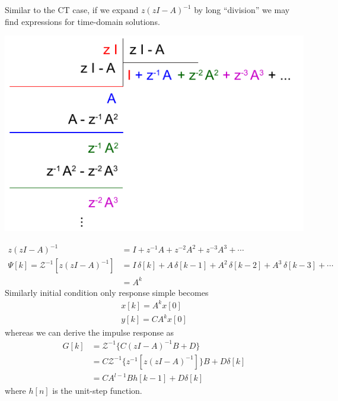 \documentclass[twoside]{article}
\begin{document}
Similar to the CT case, if we expand $z \left( z I - A \right)^{-1}$ by long ``division'' we
may find expressions for time-domain solutions. 
%
     \begin{center}
 \begin{minipage}[h]{0.5\linewidth}
     \begin{center}
       \includegraphics[width=\textwidth]{directdivision}
     \end{center}
 \end{minipage}
     \end{center}
%
\begin{align*}
z \left( z I - A \right)^{-1} &= I + z^{-1} A + z^{-2} A^2 + z^{-3} A^3
  + \cdots
\\
\Psi[k] = \mathcal{Z}^{-1} \left[ z \left( z I - A \right)^{-1} \right] &=
I \, \delta[k] + A \, \delta[k-1] + A^2 \, \delta[k-2] + A^3 \,
  \delta[k-3] + \cdots 
\\
&= A^k 
\end{align*}
%
Similarly initial condition only response simple becomes 
%
\begin{align*}
x[k] = A^k x[0]
\\
y[k] = C A^k x[0]
\end{align*}
%
whereas we can derive the impulse response as
%
\begin{align*}
G[k] &= \mathcal{Z}^{-1} \lbrace C \left( z I - A \right)^{-1} B + D \rbrace
\\
&= C \mathcal{Z}^{-1} \lbrace z^{-1}  \left[ z \left( z I - A
  \right)^{-1} \right]
  \rbrace B + D \delta[k]
\\
&= C A^{l-1} B h[k-1] +D \delta[k]  
\end{align*}
%
where $h[n]$ is the unit-step function. 

\end{document}
